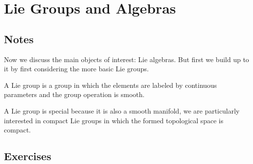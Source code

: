 \section{Lie Groups and Algebras}
\subsection{Notes}

Now we discuss the main objects of interest: Lie algebras. But first we build up to it by first considering the more basic Lie groups.

\begin{definition}
	A Lie group is a group in which the elements are labeled by continuous parameters and the group operation is smooth. 
\end{definition}

A Lie group is special because it is also a smooth manifold, we are particularly interested in compact Lie groups in which the formed topological space is compact.

\newpage 
\subsection{Exercises}

\begin{exercise}
	
\end{exercise}

\begin{exercise}
	
\end{exercise}

\begin{exercise}
	
\end{exercise}

\begin{exercise}
	
\end{exercise}